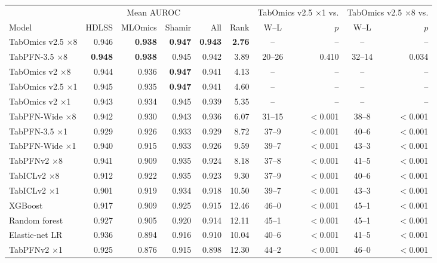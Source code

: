 \begin{tabular}{lrrrrrcrcr}
\toprule
 & \multicolumn{4}{c}{Mean AUROC} & & \multicolumn{2}{c}{TabOmics v2.5 $\times$1 vs.} & \multicolumn{2}{c}{TabOmics v2.5 $\times$8 vs.} \\
\cmidrule(lr){2-5} \cmidrule(lr){7-8} \cmidrule(lr){9-10}
Model & HDLSS & MLOmics & Shamir & All & Rank & W--L & $p$ & W--L & $p$ \\
\midrule
TabOmics v2.5 $\times$8 & 0.946 & \textbf{0.938} & \textbf{0.947} & \textbf{0.943} & \textbf{2.76} & -- & -- & -- & -- \\
TabPFN-3.5 $\times$8 & \textbf{0.948} & \textbf{0.938} & 0.945 & 0.942 & 3.89 & 20--26 & 0.410 & 32--14 & 0.034 \\
TabOmics v2 $\times$8 & 0.944 & 0.936 & \textbf{0.947} & 0.941 & 4.13 & -- & -- & -- & -- \\
TabOmics v2.5 $\times$1 & 0.945 & 0.935 & \textbf{0.947} & 0.941 & 4.60 & -- & -- & -- & -- \\
TabOmics v2 $\times$1 & 0.943 & 0.934 & 0.945 & 0.939 & 5.35 & -- & -- & -- & -- \\
TabPFN-Wide $\times$8 & 0.942 & 0.930 & 0.943 & 0.936 & 6.07 & 31--15 & $<$0.001 & 38--8 & $<$0.001 \\
TabPFN-3.5 $\times$1 & 0.929 & 0.926 & 0.933 & 0.929 & 8.72 & 37--9 & $<$0.001 & 40--6 & $<$0.001 \\
TabPFN-Wide $\times$1 & 0.940 & 0.915 & 0.933 & 0.926 & 9.59 & 39--7 & $<$0.001 & 43--3 & $<$0.001 \\
TabPFNv2 $\times$8 & 0.941 & 0.909 & 0.935 & 0.924 & 8.18 & 37--8 & $<$0.001 & 41--5 & $<$0.001 \\
TabICLv2 $\times$8 & 0.912 & 0.922 & 0.935 & 0.923 & 9.30 & 37--9 & $<$0.001 & 40--6 & $<$0.001 \\
TabICLv2 $\times$1 & 0.901 & 0.919 & 0.934 & 0.918 & 10.50 & 39--7 & $<$0.001 & 43--3 & $<$0.001 \\
XGBoost & 0.917 & 0.909 & 0.925 & 0.915 & 12.46 & 46--0 & $<$0.001 & 45--1 & $<$0.001 \\
Random forest & 0.927 & 0.905 & 0.920 & 0.914 & 12.11 & 45--1 & $<$0.001 & 45--1 & $<$0.001 \\
Elastic-net LR & 0.936 & 0.894 & 0.916 & 0.910 & 10.04 & 40--6 & $<$0.001 & 41--5 & $<$0.001 \\
TabPFNv2 $\times$1 & 0.925 & 0.876 & 0.915 & 0.898 & 12.30 & 44--2 & $<$0.001 & 46--0 & $<$0.001 \\
\bottomrule
\end{tabular}
